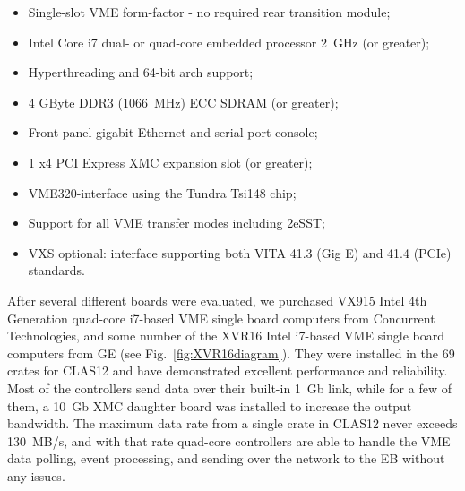 \begin{itemize}
	\item Single-slot VME form-factor - no required rear transition module;
	\item Intel Core i7 dual- or quad-core embedded processor 2~GHz (or greater);
	\item Hyperthreading and 64-bit arch support;
	\item 4 GByte DDR3 (1066~MHz) ECC SDRAM (or greater);
	\item Front-panel gigabit Ethernet and serial port console;
	\item 1 x4 PCI Express XMC expansion slot (or greater);
	\item VME320-interface using the Tundra Tsi148 chip;
	\item Support for all VME transfer modes including 2eSST;
	\item VXS optional: interface supporting both VITA 41.3 (Gig E) and 41.4 (PCIe) standards.
\end{itemize}

After several different boards were evaluated, we purchased VX915 Intel 4th Generation quad-core i7-based VME single board computers from Concurrent Technologies, and some number of the XVR16 Intel i7-based VME single board computers from GE (see Fig.~\ref{fig:XVR16diagram}). They were installed in the 69 crates for CLAS12 and have demonstrated excellent performance and reliability. Most of the controllers send data over their built-in 1~Gb link, while for a few of them, a 10~Gb XMC daughter board was installed to increase the output bandwidth. The maximum data rate from a single crate in CLAS12 never exceeds 130~MB/s, and with that rate quad-core controllers are able to handle the VME data polling, event processing, and sending over the network to the EB without any issues. 

